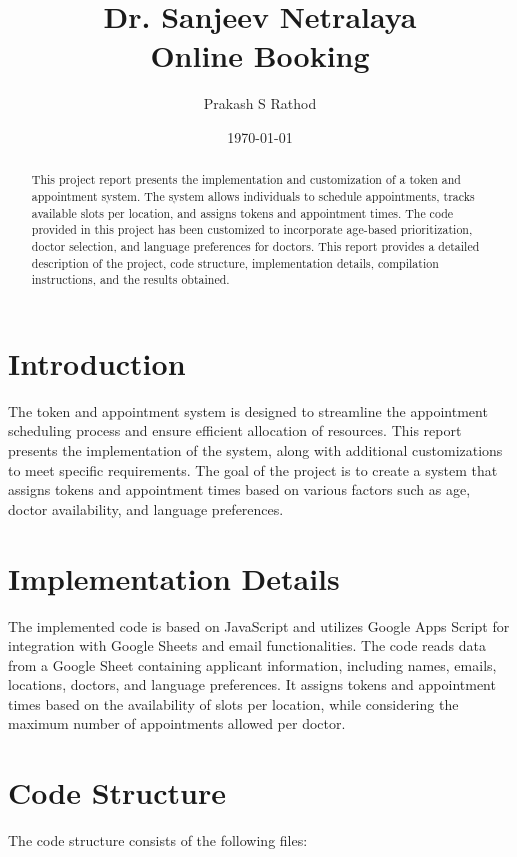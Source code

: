 \documentclass[a4paper, 12pt]{article}
\begin{document}
\title{Dr. Sanjeev Netralaya \\ Online Booking}
\author{Prakash S Rathod}
\date{\today}

\maketitle

\begin{abstract}
    This project report presents the implementation and customization of a token and appointment system. The system allows individuals to schedule appointments, tracks available slots per location, and assigns tokens and appointment times. The code provided in this project has been customized to incorporate age-based prioritization, doctor selection, and language preferences for doctors. This report provides a detailed description of the project, code structure, implementation details, compilation instructions, and the results obtained.
\end{abstract}

\section{Introduction}
The token and appointment system is designed to streamline the appointment scheduling process and ensure efficient allocation of resources. This report presents the implementation of the system, along with additional customizations to meet specific requirements. The goal of the project is to create a system that assigns tokens and appointment times based on various factors such as age, doctor availability, and language preferences.

\section{Implementation Details}
The implemented code is based on JavaScript and utilizes Google Apps Script for integration with Google Sheets and email functionalities. The code reads data from a Google Sheet containing applicant information, including names, emails, locations, doctors, and language preferences. It assigns tokens and appointment times based on the availability of slots per location, while considering the maximum number of appointments allowed per doctor.

\section{Code Structure}
The code structure consists of the following files:
\end{document}

